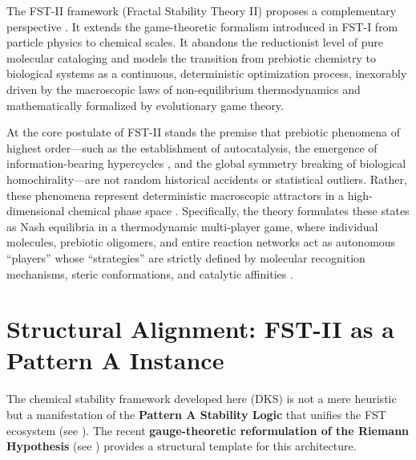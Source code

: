 \documentclass[12pt,a4paper]{article}
\theoremstyle{remark}
\begin{document}
The FST-II framework (Fractal Stability Theory II) proposes a complementary perspective \citep{England2013}. It extends the game-theoretic formalism introduced in FST-I \citep{FSTI} from particle physics to chemical scales. It abandons the reductionist level of pure molecular cataloging and models the transition from prebiotic chemistry to biological systems as a continuous, deterministic optimization process, inexorably driven by the macroscopic laws of non-equilibrium thermodynamics and mathematically formalized by evolutionary game theory.

At the core postulate of FST-II stands the premise that prebiotic phenomena of highest order---such as the establishment of autocatalysis, the emergence of information-bearing hypercycles \citep{Eigen1979}, and the global symmetry breaking of biological homochirality---are not random historical accidents or statistical outliers. Rather, these phenomena represent deterministic macroscopic attractors in a high-dimensional chemical phase space \citep{ReplicatorEntropy}. Specifically, the theory formulates these states as Nash equilibria in a thermodynamic multi-player game, where individual molecules, prebiotic oligomers, and entire reaction networks act as autonomous ``players'' whose ``strategies'' are strictly defined by molecular recognition mechanisms, steric conformations, and catalytic affinities \citep{CGT2018,CGTMacmillan}.

\section{Structural Alignment: FST-II as a Pattern A Instance}
\label{sec:structural-alignment}

The chemical stability framework developed here (DKS) is not a mere heuristic but a manifestation of the \textbf{Pattern A Stability Logic} that unifies the FST ecosystem (see \cite{FST-Unified2026}). The recent \textbf{gauge-theoretic reformulation of the Riemann Hypothesis} (see \cite{GeigerRH2026c}) provides a structural template for this architecture.
\end{document}
